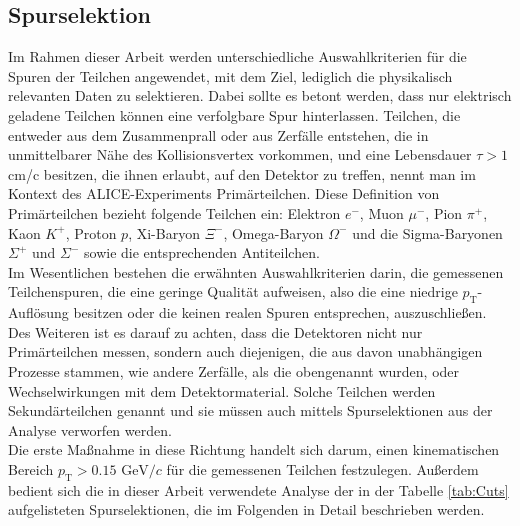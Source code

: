 \documentclass[12pt,a4paper]{report}
\begin{document}
\subsection{Spurselektion}
\label{sec:Spurselektion}
Im Rahmen dieser Arbeit werden unterschiedliche Auswahlkriterien für die Spuren der Teilchen angewendet, mit dem Ziel, lediglich die physikalisch relevanten Daten zu selektieren. Dabei sollte es betont werden, dass nur elektrisch geladene Teilchen können eine verfolgbare Spur hinterlassen. Teilchen, die entweder aus dem Zusammenprall oder aus Zerfälle entstehen, die in unmittelbarer Nähe des Kollisionsvertex vorkommen, und eine Lebensdauer $\tau > 1$ cm/c besitzen, die ihnen erlaubt, auf den Detektor zu treffen, nennt man im Kontext des ALICE-Experiments Primärteilchen. Diese Definition von Primärteilchen bezieht folgende Teilchen ein: Elektron $e^-$, Muon $\mu^-$, Pion $\pi^+$, Kaon $K^+$, Proton $p$, Xi-Baryon $\Xi^-$, Omega-Baryon $\Omega^-$ und die Sigma-Baryonen $\Sigma^+$ und $\Sigma^-$  sowie die entsprechenden Antiteilchen.\\
Im Wesentlichen bestehen die erwähnten Auswahlkriterien darin, die gemessenen Teilchenspuren, die eine geringe Qualität aufweisen, also die eine niedrige $p_{\mathrm{T}}$-Auflösung besitzen oder die keinen realen Spuren entsprechen, auszuschließen. Des Weiteren ist es darauf zu achten, dass die Detektoren nicht nur Primärteilchen messen, sondern auch diejenigen, die aus davon unabhängigen Prozesse stammen, wie andere Zerfälle, als die obengenannt wurden, oder Wechselwirkungen mit dem Detektormaterial. Solche Teilchen werden Sekundärteilchen genannt und sie müssen auch mittels Spurselektionen aus der Analyse verworfen werden.\\
Die erste Maßnahme in diese Richtung handelt sich darum, einen kinematischen Bereich $p_{\mathrm{T}} > 0.15$  $\mathrm{GeV}/c$ für die gemessenen Teilchen festzulegen. Außerdem bedient sich die in dieser Arbeit verwendete Analyse der in der Tabelle \ref{tab:Cuts} aufgelisteten Spurselektionen, die im Folgenden in Detail beschrieben werden.\\ \\
\end{document}
